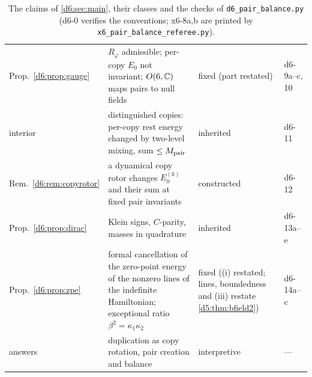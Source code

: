 \begin{table}[t]
\begin{tabular}{@{}>{\raggedright\arraybackslash}p{2.7cm}>{\raggedright\arraybackslash}p{7.2cm}>{\raggedright\arraybackslash}p{3.2cm}>{\raggedright\arraybackslash}p{1.4cm}@{}}
Prop.~\ref{d6:prop:gauge} & $R_\varphi$ admissible; per-copy $E_0$ not invariant; $O(6,\mathbb{C})$ maps pairs to null fields & fixed (part restated) & d6-9a--c, 10\\
interior & distinguished copies: per-copy rest energy changed by two-level mixing, sum $\le M_{\rm pair}$ & inherited & d6-11\\
Rem.~\ref{d6:rem:copyrotor} & a dynamical copy rotor changes $E_0^{(k)}$ and their sum at fixed pair invariants & constructed & d6-12\\
Prop.~\ref{d6:prop:dirac} & Klein signs, $C$-parity, masses in quadrature & inherited & d6-13a--e\\
Prop.~\ref{d6:prop:zpe} & formal cancellation of the zero-point energy of the nonzero lines of the indefinite Hamiltonian; exceptional ratio $\beta^2=\kappa_1\kappa_2$ & fixed ((i) restated; lines, boundedness and (iii) restate \cref{d5:thm:bfield2}) & d6-14a--c\\
answers & duplication as copy rotation, pair creation and balance & interpretive & ---\\
\bottomrule
\end{tabular}
\caption{The claims of \cref{d6:sec:main}, their classes and the checks of \texttt{d6\_pair\_balance.py} (d6-0 verifies the conventions; x6-8a,b are printed by \texttt{x6\_pair\_balance\_referee.py}).}
\label{d6:tab:claims}
\end{table}

